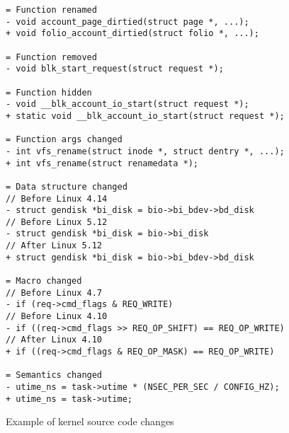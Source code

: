 \begin{listing}[t]
\begin{verbatim}
= Function renamed
- void account_page_dirtied(struct page *, ...);
+ void folio_account_dirtied(struct folio *, ...);

= Function removed
- void blk_start_request(struct request *);

= Function hidden
- void __blk_account_io_start(struct request *);
+ static void __blk_account_io_start(struct request *);

= Function args changed
- int vfs_rename(struct inode *, struct dentry *, ...);
+ int vfs_rename(struct renamedata *);

= Data structure changed
// Before Linux 4.14
- struct gendisk *bi_disk = bio->bi_bdev->bd_disk
// Before Linux 5.12
- struct gendisk *bi_disk = bio->bi_disk
// After Linux 5.12
+ struct gendisk *bi_disk = bio->bi_bdev->bd_disk

= Macro changed
// Before Linux 4.7
- if (req->cmd_flags & REQ_WRITE)
// Before Linux 4.10
- if ((req->cmd_flags >> REQ_OP_SHIFT) == REQ_OP_WRITE)
// After Linux 4.10
+ if ((req->cmd_flags & REQ_OP_MASK) == REQ_OP_WRITE)

= Semantics changed
- utime_ns = task->utime * (NSEC_PER_SEC / CONFIG_HZ);
+ utime_ns = task->utime;
\end{verbatim}
\caption{Example of kernel source code changes}
\label{fig:kernel_source_code_changes}
\end{listing}

